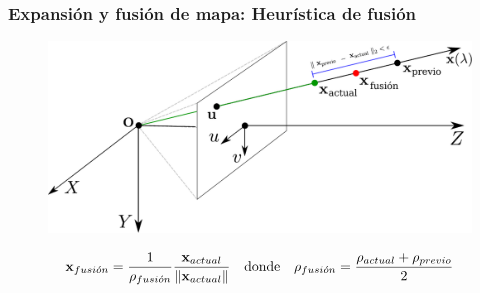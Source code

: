 \documentclass[compress]{beamer}
\begin{document}
\begin{frame}
	\frametitle{Expansión y fusión de mapa: Heurística de fusión}
	\begin{figure}[htb]
		\centering
		\includegraphics[width=\columnwidth]{method/metodo-fusion-spa.pdf}
	\end{figure}
	\begin{equation*}
		\boldsymbol{\mathbf{x}}_{fusi\acute{o}n}=\frac{1}{\rho_{fusi\acute{o}n}}\frac{\boldsymbol{\mathbf{x}}_{actual}}{\left\lVert\boldsymbol{\mathbf{x}}_{actual}\right\rVert}
		\quad \text{donde} \quad 
		\rho_{fusi\acute{o}n}=\frac{\rho_{actual}+\rho_{previo}}{2}
	\end{equation*}
\end{frame}


\end{document}
